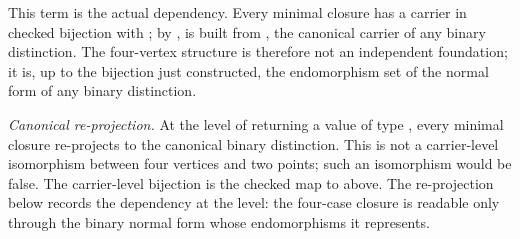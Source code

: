 \documentclass[11pt]{article}
\begin{document}
This term is the actual dependency.  Every minimal closure has a
carrier in checked bijection with ; by
,  is built from
, the canonical carrier of any binary distinction.
The four-vertex structure is therefore not an independent foundation;
it is, up to the bijection just constructed, the endomorphism set of
the normal form of any binary distinction.

\emph{Canonical re-projection.}  At the level of returning a value of
type , every minimal closure re-projects to
the canonical binary distinction.  This is not a carrier-level
isomorphism between four vertices and two points; such an isomorphism
would be false.  The carrier-level bijection is the checked map to
 above.  The re-projection below records the
dependency at the  level: the four-case closure
is readable only through the binary normal form whose endomorphisms it
represents.
\end{document}
